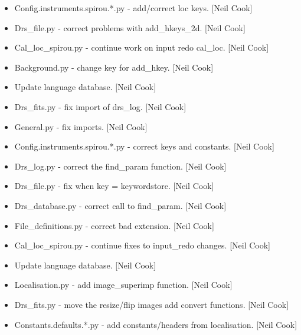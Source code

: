 \documentclass[a4paper,10pt,english]{report}
\begin{document}
\begin{itemize}
\item {} 
Config.instruments.spirou.*.py - add/correct loc keys. {[}Neil Cook{]}

\item {} 
Drs\_file.py - correct problems with add\_hkeys\_2d. {[}Neil Cook{]}

\item {} 
Cal\_loc\_spirou.py - continue work on input redo cal\_loc. {[}Neil Cook{]}

\item {} 
Background.py - change key for add\_hkey. {[}Neil Cook{]}

\item {} 
Update language database. {[}Neil Cook{]}

\item {} 
Drs\_fits.py - fix import of drs\_log. {[}Neil Cook{]}

\item {} 
General.py - fix imports. {[}Neil Cook{]}

\item {} 
Config.instruments.spirou.*.py - correct keys and constants. {[}Neil
Cook{]}

\item {} 
Drs\_log.py - correct the find\_param function. {[}Neil Cook{]}

\item {} 
Drs\_file.py - fix when key = keywordstore. {[}Neil Cook{]}

\item {} 
Drs\_database.py - correct call to find\_param. {[}Neil Cook{]}

\item {} 
File\_definitions.py - correct bad extension. {[}Neil Cook{]}

\item {} 
Cal\_loc\_spirou.py - continue fixes to input\_redo changes. {[}Neil Cook{]}

\item {} 
Update language database. {[}Neil Cook{]}

\item {} 
Localisation.py - add image\_superimp function. {[}Neil Cook{]}

\item {} 
Drs\_fits.py - move the resize/flip images add convert functions. {[}Neil
Cook{]}

\item {} 
Constants.defaults.*.py - add constants/headers from localisation.
{[}Neil Cook{]}


\end{itemize}
\end{document}
